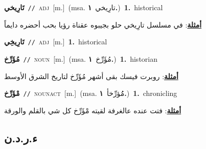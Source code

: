 \documentclass[10pt,a4paper,twoside]{article} %
\begin{document}
\begin{multicols}{2}
{\setlength\topsep{0pt}\textbf{\foreignlanguage{arabic}{تَارِيخي}}\ {\color{gray}\texttt{//}\color{black}}\ \textsc{adj}\ [m.]\ \color{gray}(msa. \foreignlanguage{arabic}{تارِيخي}~\foreignlanguage{arabic}{\textbf{١.}})\color{black}\ \textbf{1.}~historical\  \begin{flushright}\color{gray}\foreignlanguage{arabic}{\textbf{\underline{\foreignlanguage{arabic}{أمثلة}}}: في مسلسل تارِيخي حلو بجيبوه عقناة رؤيا بحب أحضره دايماً}\end{flushright}\color{black}} \vspace{2mm}

{\setlength\topsep{0pt}\textbf{\foreignlanguage{arabic}{تَارِيخِي}}\ {\color{gray}\texttt{//}\color{black}}\ \textsc{adj}\ [m.]\ \textbf{1.}~historical\ } \vspace{2mm}

{\setlength\topsep{0pt}\textbf{\foreignlanguage{arabic}{مُؤَرِّخ}}\ {\color{gray}\texttt{//}\color{black}}\ \textsc{noun}\ [m.]\ \color{gray}(msa. \foreignlanguage{arabic}{مُؤَرِّخ}~\foreignlanguage{arabic}{\textbf{١.}})\color{black}\ \textbf{1.}~historian\  \begin{flushright}\color{gray}\foreignlanguage{arabic}{\textbf{\underline{\foreignlanguage{arabic}{أمثلة}}}: روبرت فيسك بقى أشهر مُؤَرِّخ لتاريخ الشرق الأوسط}\end{flushright}\color{black}} \vspace{2mm}

{\setlength\topsep{0pt}\textbf{\foreignlanguage{arabic}{مْؤَرِّخ}}\ {\color{gray}\texttt{//}\color{black}}\ \textsc{noun\textunderscore act}\ [m.]\ \color{gray}(msa. \foreignlanguage{arabic}{مُُؤرِّخأ}~\foreignlanguage{arabic}{\textbf{١.}})\color{black}\ \textbf{1.}~chronicling\  \begin{flushright}\color{gray}\foreignlanguage{arabic}{\textbf{\underline{\foreignlanguage{arabic}{أمثلة}}}: فتت عنده عالغرفة لقيته مْؤَرِّخ كل شي بالقلم والورقة}\end{flushright}\color{black}} \vspace{2mm}

\vspace{-3mm}
\subsection*{\color{blue}\foreignlanguage{arabic}{ء.ر.د.ن}\color{blue}{ (ntws)}} 


\end{multicols}
\end{document}
